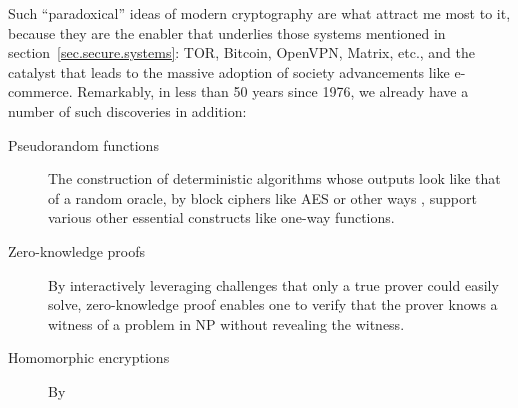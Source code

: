 \documentclass{article}
\begin{document}
Such ``paradoxical'' ideas of modern cryptography are what attract me most to
it, because they are the enabler that underlies those systems mentioned in
section~\ref{sec.secure.systems}: TOR, Bitcoin, OpenVPN, Matrix, etc., and the
catalyst that leads to the massive adoption of society advancements like
e-commerce. Remarkably, in less than 50 years since 1976, we already have a
number of such discoveries in addition:
\begin{description}
\item[Pseudorandom functions] The construction of deterministic algorithms
	whose outputs look like that of a random oracle, by block ciphers like
	AES\cite{aes} or other ways \cite{pseudo.rand.cons.2}, support various
	other essential constructs like one-way functions.

\item[Zero-knowledge proofs] By interactively leveraging challenges that only a
	true prover could easily solve, zero-knowledge proof \cite{zero.knowledge}
	enables one to verify that the prover knows a witness of a problem in NP
	\cite{zero.knowledge.np} without revealing the witness.

\item[Homomorphic encryptions] By 
\end{description}



\end{document}
